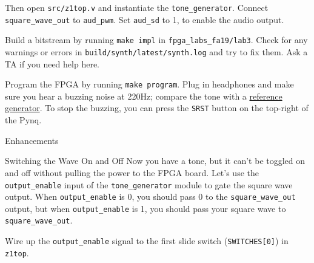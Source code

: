 \documentclass[11pt]{article}
\makeatletter
\newcommand{\RepoRootPath}{fpga\_labs\_fa19}
\renewcommand{\section}
{\@startsection {section}{1}{0pt}
 {-2ex}
 {1ex}
 {\bfseries\Large}}
\renewcommand{\subsection}
{\@startsection {subsection}{1}{0pt}
 {-1ex}
 {0.5ex}
 {\bfseries\normalsize}}
\makeatother
\begin{document}
Then open \verb|src/z1top.v| and instantiate the \verb|tone_generator|.
Connect \verb|square_wave_out| to \verb|aud_pwm|.
Set \verb|aud_sd| to 1, to enable the audio output.

Build a bitstream by running \texttt{make impl} in \texttt{\RepoRootPath/lab3}.
Check for any warnings or errors in \texttt{build/synth/latest/synth.log} and try to fix them.
Ask a TA if you need help here.

Program the FPGA by running \texttt{make program}.
Plug in headphones and make sure you hear a buzzing noise at 220Hz; compare the tone with a \href{https://www.szynalski.com/tone-generator/}{reference generator}.
To stop the buzzing, you can press the \verb|SRST| button on the top-right of the Pynq.



\section{Enhancements}
\subsection{Switching the Wave On and Off}
Now you have a tone, but it can't be toggled on and off without pulling the power to the FPGA board. Let's use the \verb|output_enable| input of the \verb|tone_generator| module to gate the square wave output. When \verb|output_enable| is 0, you should pass 0 to the \verb|square_wave_out| output, but when \verb|output_enable| is 1, you should pass your square wave to \verb|square_wave_out|.

Wire up the \verb|output_enable| signal to the first slide switch (\verb|SWITCHES[0]|) in \verb|z1top|.
\end{document}
